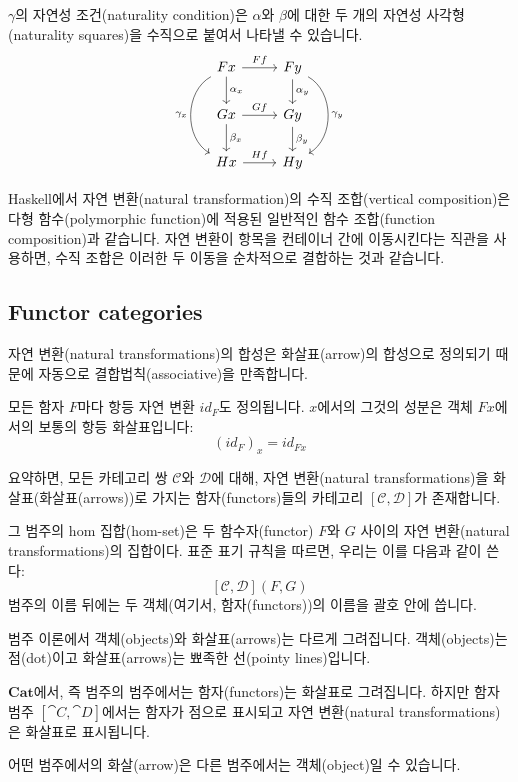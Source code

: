 \documentclass[DaoFP]{subfiles}
\begin{document}
$\gamma$의 자연성 조건(naturality condition)은 $\alpha$와 $\beta$에 대한 두 개의 자연성 사각형(naturality squares)을 수직으로 붙여서 나타낼 수 있습니다.
\[
 \begin{tikzcd}
 F x
 \arrow[d, "\alpha_x"]
 \arrow[r, "F f"]
 \arrow[dd, bend right = 60, "\gamma_x"']
 &
F y
  \arrow[d, "\alpha_y"]
 \arrow[dd, bend left = 60, "\gamma_y"]
 \\
G x
 \arrow[r, "G f"]
 \arrow[d, "\beta_x"]
& G y
\arrow[d, "\beta_y"]
\\
H x
\arrow[r, "H f"]
& H y
 \end{tikzcd}
\]

Haskell에서 자연 변환(natural transformation)의 수직 조합(vertical composition)은 다형 함수(polymorphic function)에 적용된 일반적인 함수 조합(function composition)과 같습니다. 자연 변환이 항목을 컨테이너 간에 이동시킨다는 직관을 사용하면, 수직 조합은 이러한 두 이동을 순차적으로 결합하는 것과 같습니다.

\subsection{Functor categories}

자연 변환(natural transformations)의 합성은 화살표(arrow)의 합성으로 정의되기 때문에 자동으로 결합법칙(associative)을 만족합니다.

모든 함자 $F$마다 항등 자연 변환 $id_F$도 정의됩니다. $x$에서의 그것의 성분은 객체 $F x$에서의 보통의 항등 화살표입니다:
\[ (id_F)_x = id_{F x} \]

요약하면, 모든 카테고리 쌍 $\mathcal{C}$와 $\mathcal{D}$에 대해, 자연 변환(natural transformations)을 화살표(화살표(arrows))로 가지는 함자(functors)들의 카테고리 $[\mathcal{C}, \mathcal{D}]$가 존재합니다.

그 범주의 hom 집합(hom-set)은 두 함수자(functor) $F$와 $G$ 사이의 자연 변환(natural transformations)의 집합이다. 표준 표기 규칙을 따르면, 우리는 이를 다음과 같이 쓴다:
\[ [\mathcal{C}, \mathcal{D}](F, G) \]
범주의 이름 뒤에는 두 객체(여기서, 함자(functors))의 이름을 괄호 안에 씁니다.

범주 이론에서 객체(objects)와 화살표(arrows)는 다르게 그려집니다. 객체(objects)는 점(dot)이고 화살표(arrows)는 뾰족한 선(pointy lines)입니다.

$\mathbf{Cat}$에서, 즉 범주의 범주에서는 함자(functors)는 화살표로 그려집니다. 하지만 함자 범주 $[\cat C, \cat D]$에서는 함자가 점으로 표시되고 자연 변환(natural transformations)은 화살표로 표시됩니다.

어떤 범주에서의 화살(arrow)은 다른 범주에서는 객체(object)일 수 있습니다.
\end{document}
